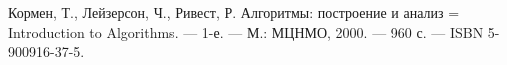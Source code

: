\begin{thebibliography}{99}
Кормен, Т., Лейзерсон, Ч., Ривест, Р. Алгоритмы: построение и анализ = Introduction to Algorithms. — 1-е. — М.: МЦНМО, 2000. — 960 с. — ISBN 5-900916-37-5.
\end{thebibliography}